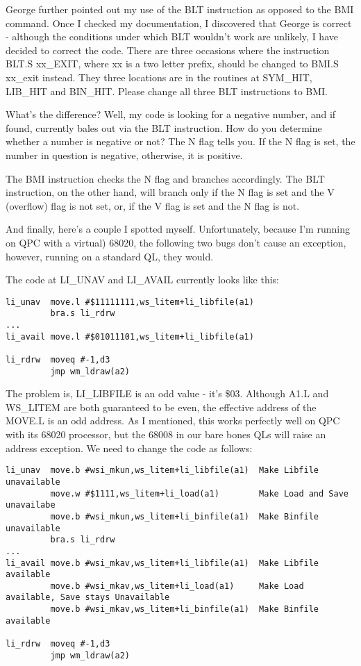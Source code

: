 George further pointed out my use of the BLT instruction as opposed
    to the BMI command. Once I checked my documentation, I discovered that
    George is correct -{} although the conditions under which BLT wouldn't work
    are unlikely, I have decided to correct the code. There are three
    occasions where the instruction BLT.S xx\_EXIT, where xx is a two letter
    prefix, should be changed to BMI.S xx\_exit instead. They three locations
    are in the routines at SYM\_HIT,
 LIB\_HIT and BIN\_HIT. Please
    change all three BLT instructions to BMI.

What's the difference? Well, my code is looking for a negative
    number, and if found, currently bales out via the BLT instruction. How do
    you determine whether a number is negative or not? The N flag tells you.
    If the N flag is set, the number in question is negative, otherwise, it is
    positive.

The BMI instruction checks the N flag and branches accordingly. The
    BLT instruction, on the other hand, will branch only if the N flag is set
    and the V (overflow) flag is not set, or, if the V flag is set and the N
    flag is not.

And finally, here's a couple I spotted myself. Unfortunately,
    because I'm running on QPC with a virtual) 68020, the following two bugs
    don't cause an exception, however, running on a standard QL, they
    would.

The code at LI\_UNAV and
 LI\_AVAIL currently looks like this:

\begin{lstlisting}[firstnumber=1,]
li_unav  move.l #$11111111,ws_litem+li_libfile(a1)
         bra.s li_rdrw
...
li_avail move.l #$01011101,ws_litem+li_libfile(a1)

li_rdrw  moveq #-1,d3
         jmp wm_ldraw(a2) 
\end{lstlisting}

The problem is, LI\_LIBFILE is an odd value -{} it's \$03. Although A1.L
    and WS\_LITEM are both guaranteed to be even, the effective address of the
    MOVE.L is an odd address. As I mentioned, this works perfectly well on QPC
    with its 68020 processor, but the 68008 in our bare bones QLs will raise
    an address exception. We need to change the code as follows:

\begin{lstlisting}[firstnumber=1,]
li_unav  move.b #wsi_mkun,ws_litem+li_libfile(a1)  Make Libfile unavailable
         move.w #$1111,ws_litem+li_load(a1)        Make Load and Save unavailabe
         move.b #wsi_mkun,ws_litem+li_binfile(a1)  Make Binfile unavailable
         bra.s li_rdrw
...
li_avail move.b #wsi_mkav,ws_litem+li_libfile(a1)  Make Libfile available
         move.b #wsi_mkav,ws_litem+li_load(a1)     Make Load available, Save stays Unavailable
         move.b #wsi_mkav,ws_litem+li_binfile(a1)  Make Binfile available

li_rdrw  moveq #-1,d3
         jmp wm_ldraw(a2) 
\end{lstlisting}


